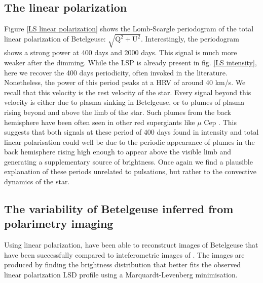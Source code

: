 \documentclass{aa}
\begin{document}
\subsection{The linear polarization}

Figure \ref{LS linear polarization} shows the Lomb-Scargle periodogram of the total linear polarization of Betelgeuse: $\sqrt{\mathrm{Q^2+U^2}}$. 
Interestingly, the periodogram shows a strong power at 400 days and 2000 days. This signal is much more weaker after the dimming.
While the LSP is already present in fig. \ref{LS intensity}, here we recover the 400 days periodicity, often invoked in the literature. 
Nonetheless, the power of this period peaks at a HRV of around 40 km/s. We recall that this velocity is the rest velocity of the star. 
Every signal beyond this velocity is either due to  plasma sinking in Betelgeuse, or to plumes of plasma rising beyond and above the limb of the star. 
Such plumes from the back hemisphere have been often seen in other red supergiants like $\mu$ Cep \citep{lopez_ariste_height_2023}. 
This suggests that both signals at these period of 400 days found in intensity and total linear polarisation 
could well be due to the periodic appearance of plumes in the back hemisphere rising high enough to appear above
the visible limb and generating a supplementary source of brightness. Once again we find a plausible explanation 
of these periods unrelated to pulsations, but rather to the convective dynamics of the star.


\subsection{The variability of Betelgeuse inferred from polarimetry imaging}

Using linear polarization, \cite{lopez_ariste_convective_2018} have been able to reconstruct images of Betelgeuse that have been successfully compared 
to inteferometric images of \cite{montarges_close_2016}. The images are produced by finding the brightness distribution that better fits the observed linear 
polarization LSD profile using a Marquardt-Levenberg minimisation.
\end{document}
